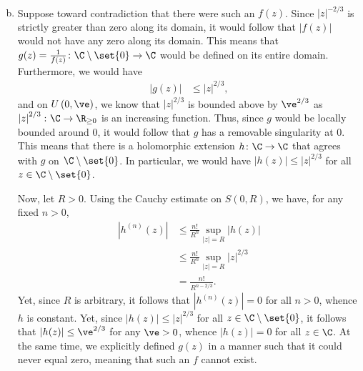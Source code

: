 \documentclass[10pt]{mypackage}
\begin{document}
\begin{solution}
\begin{enumerate}[(a)]
\begin{align*}
      \end{align*}
    \item Suppose toward contradiction that there were such an $f(z)$. Since $\left\vert z \right\vert^{-2/3}$ is strictly greater than zero along its domain, it would follow that $\left\vert f(z) \right\vert$ would not have any zero along its domain. This means that $ g(z) = \frac{1}{f(z)}\colon\C\setminus \set{0}\rightarrow\C $ would be defined on its entire domain. Furthermore, we would have
      \begin{align*}
        \left\vert g(z) \right\vert &\leq \left\vert z \right\vert^{2/3},
      \end{align*}
      and on $U\left( 0,\ve \right)$, we know that $\left\vert z \right\vert^{2/3}$ is bounded above by $\ve^{2/3}$ as $\left\vert z \right\vert^{2/3}\colon \C\rightarrow \R_{\geq 0}$ is an increasing function. Thus, since $g$ would be locally bounded around $0$, it would follow that $g$ has a removable singularity at $0$. This means that there is a holomorphic extension $h\colon \C\rightarrow \C$ that agrees with $g$ on $\C\setminus \set{0}$. In particular, we would have $\left\vert h(z) \right\vert \leq \left\vert z \right\vert^{2/3}$ for all $z\in \C\setminus\set{0}$.\newline

      Now, let $R > 0$. Using the Cauchy estimate on $S\left( 0,R \right)$, we have, for any fixed $n > 0$,
      \begin{align*}
        \left\vert h^{(n)}(z) \right\vert &\leq \frac{n!}{R^{n}} \sup_{\left\vert z \right\vert = R} \left\vert h(z) \right\vert\\
                                          &\leq \frac{n!}{R^{n}} \sup_{\left\vert z \right\vert = R} \left\vert z \right\vert^{2/3}\\
                                          &= \frac{n!}{R^{n-2/3}}.
      \end{align*}
      Yet, since $R$ is arbitrary, it follows that $\left\vert h^{(n)}(z) \right\vert = 0$ for all $n > 0$, whence $h$ is constant. Yet, since $\left\vert h(z) \right\vert \leq \left\vert z \right\vert^{2/3}$ for all $z \in \C\setminus \set{0}$, it follows that $\left\vert h(z) \right\vert \leq \ve^{2/3}$ for any $\ve > 0$, whence $\left\vert h(z) \right\vert = 0$ for all $z\in \C$. At the same time, we explicitly defined $g(z)$ in a manner such that it could never equal zero, meaning that such an $f$ cannot exist.
  \end{enumerate}
\end{solution}
\end{document}
